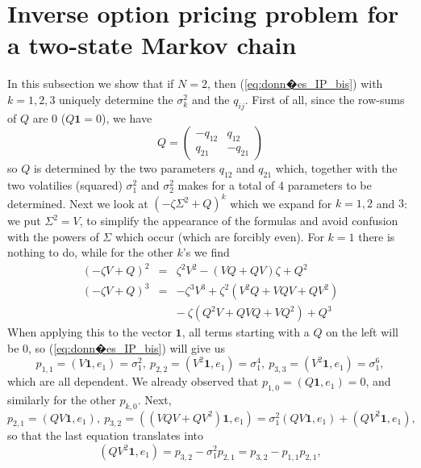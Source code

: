 \documentclass[a4paper, 11pt]{amsart}
\newtheorem{definition and theorem}[theorem]{Definition and   
Theorem}
\begin{document}
\section{\bf Inverse option pricing problem for a two-state Markov chain} In this subsection we show that if $N = 2 $, then (\ref{eq:donn�es_IP_bis}) with $k = 1, 2, 3 $ uniquely determine the $\sigma _k ^2 $  and the $q_{ij} . $ First of all, since the row-sums of $Q $ are 0 ($Q \mathbf{1 } = 0 $), we have
$$
    Q = \begin{pmatrix} - q_{12 } & q_{12 }    \\
                q_{21 }   & - q _{21 }
    \end{pmatrix}
$$
so $Q $ is determined by the two parameters $q_{12 } $ and $q_{21 } $ which, together with the two volatilies (squared) $\sigma _1 ^2 $ and $\sigma _2 ^2 $ makes for a total of 4 parameters to be determined. Next we look at $(- \zeta \Sigma ^2 + Q )^k $ which we expand for $k = 1 , 2 $ and $3 $: we put $\Sigma ^2 = V $, to simplify the appearance of the formulas and avoid confusion with the powers of $\Sigma $ which occur (which are forcibly even). For $k = 1 $ there is nothing to do, while for the other $k $'s we find
$$
    \begin{array}{cccc}
        (- \zeta V + Q )^2 & =  & \zeta ^2 V ^2 - (V Q + Q V) \zeta + Q^2            \\
        (- \zeta V + Q )^3 & =  & - \zeta ^3 V^3 + \zeta ^2 (V^2 Q + V Q V + Q V^2 ) \\
        \                  & \  & - \ \zeta (Q^2 V + QVQ + V Q^2 ) + Q^3
    \end{array}
$$
When applying this to the vector $\mathbf{1 } $, all terms starting with a $Q $ on the left will be 0, so (\ref{eq:donn�es_IP_bis}) will give us
$$
    p_{1, 1 } = (V \mathbf{1 } , e_1 ) = \sigma _1 ^2 , \ p_{2, 2 } = (V^2 \mathbf{1 } , e_1 ) = \sigma _1 ^4 ,  \ p_{3, 3 } = (V^2 \mathbf{1 } , e_1 ) = \sigma _1 ^6 ,
$$
which are all dependent. We already observed that $p_{1, 0 } = (Q \mathbf{1 } , e_1 ) = 0 $, and similarly for the other $p_{k, 0 } . $ Next,
\begin{equation} \label{eq:two_state_1}
    p_{2, 1 } = (Q V \mathbf{1 } , e_1 ) , \ p_{3, 2 } = ((V Q V + Q V^2 ) \mathbf{1 } , e_1 ) = \sigma _1 ^2 (Q V \mathbf{1 } , e_1 ) + (Q V^2 \mathbf{1 } , e_1 ) ,
\end{equation}
so that the last equation translates into
\begin{equation} \label{eq:two_state_2}
    (Q V^2 \mathbf{1 } , e_1 ) = p_{3, 2 } - \sigma _1 ^2 p_{2, 1 } = p_{3, 2 } - p_{1, 1 } p_{2, 1 } ,
\end{equation}
\end{document}
